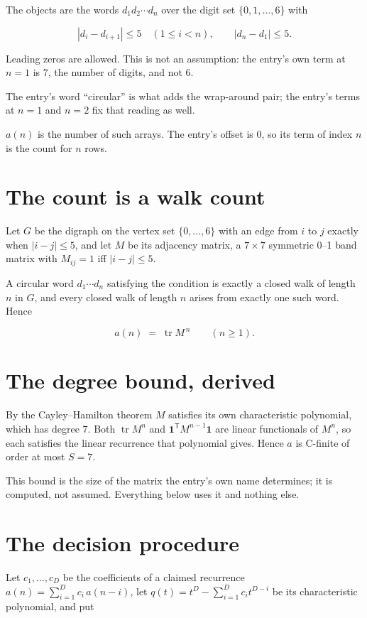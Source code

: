 \documentclass[11pt]{article}
\theoremstyle{definition}
\begin{document}
The objects are the words $d_1 d_2 \cdots d_n$ over the digit set $\{0,1,\dots,6\}$ with

\[|d_i - d_{i+1}| \le 5\quad (1 \le i < n), \qquad |d_n - d_1| \le 5.\]

Leading zeros are allowed. This is not an assumption: the entry's own term at $n=1$ is $7$, the number of digits, and not $6$.

The entry's word ``circular'' is what adds the wrap-around pair; the entry's terms at $n = 1$ and $n = 2$ fix that reading as well.

$a(n)$ is the number of such arrays. The entry's offset is 0, so its term of index $n$ is the count for $n$ rows.

\section{The count is a walk count}

Let $G$ be the digraph on the vertex set $\{0,\dots,6\}$ with an edge from $i$ to $j$ exactly when $|i-j| \le 5$, and let $M$ be its adjacency matrix, a $7 \times 7$ symmetric 0--1 band matrix with $M_{ij} = 1$ iff $|i-j| \le 5$.

A circular word $d_1\cdots d_n$ satisfying the condition is exactly a closed walk of length $n$ in $G$, and every closed walk of length $n$ arises from exactly one such word. Hence

\[a(n) \;=\; \operatorname{tr} M^{\,n} \qquad (n \ge 1).\]

\section{The degree bound, derived}

By the Cayley--Hamilton theorem $M$ satisfies its own characteristic polynomial, which has degree $7$. Both $\operatorname{tr} M^n$ and $\mathbf 1^{\mathsf T} M^{n-1} \mathbf 1$ are linear functionals of $M^{n}$, so each satisfies the linear recurrence that polynomial gives. Hence $a$ is C-finite of order at most $S = 7$.

This bound is the size of the matrix the entry's own name determines; it is computed, not assumed. Everything below uses it and nothing else.

\section{The decision procedure}

Let $c_1,\dots,c_D$ be the coefficients of a claimed recurrence $a(n) = \sum_{i=1}^{D} c_i\,a(n-i)$, let $q(t) = t^{D} - \sum_{i=1}^{D} c_i t^{D-i}$ be its characteristic polynomial, and put
\end{document}
